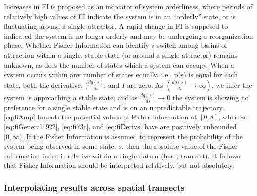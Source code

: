 \documentclass[12pt,twoside,openany]{reedthesis}
\begin{document}
Increases in FI is proposed as an indicator of system orderliness, where
periods of relatively high values of FI indicate the system is in an
``orderly'' state, or is fluctuating around a single attractor. A rapid
change in FI is supposed to indicated the system is no longer orderly
and may be undergoing a reorganization phase. Whether Fisher Information
can identify a switch among basins of attraction within a single, stable
state (or around a single attractor) remains unknown, as does the number
of states which a system can occupy. When a system occurs within any
number of states equally, i.e., p(s) is equal for each state, both the
derivative, (\(\frac{dq(s)}{ds}\), and \(I\) are zero. As
\((\frac{dq(s)}{ds} \rightarrow \infty)\), we infer the system is
approaching a stable state, and as \(\frac{dq(s)}{ds} \rightarrow 0\)
the system is showing no preference for a single stable state and is on
an unpredictable trajectory. \eqref{eq:fiAmp} bounds the potential values
of Fisher Information at \([0, 8]\), whereas \eqref{eq:fiGeneral1922},
\eqref{eq:fi73c}, and \eqref{eq:fiDerivs} have are positively unbounded
\([0, \infty)\). If the Fisher Information is assumed to represent the
probability of the system being observed in some state, \(s\), then the
absolute value of the Fisher Information index is relative within a
single datum (here, transect). It follows that Fisher Information should
be interpreted relatively, but not absolutely.

\subsubsection{Interpolating results across spatial
transects}\label{interpolating-results-across-spatial-transects}
\end{document}
